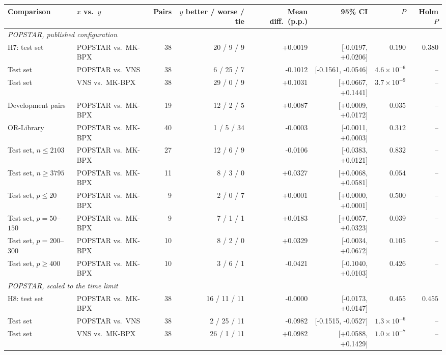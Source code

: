 \begin{tabular}{llrrrrrr}
\toprule
Comparison & $x$ vs.\ $y$ & Pairs & $y$ better / worse / tie & Mean diff.\ (p.p.) & 95\% CI & $P$ & Holm $P$ \\
\midrule
\multicolumn{8}{l}{\emph{POPSTAR, published configuration}} \\
\quad H7: test set & POPSTAR vs.\ MK-BPX & 38 & 20 / 9 / 9 & +0.0019 & [-0.0197, +0.0206] & $0.190$ & $0.380$ \\
\quad Test set & POPSTAR vs.\ VNS & 38 & 6 / 25 / 7 & -0.1012 & [-0.1561, -0.0546] & $4.6\times10^{-6}$ & -- \\
\quad Test set & VNS vs.\ MK-BPX & 38 & 29 / 0 / 9 & +0.1031 & [+0.0667, +0.1441] & $3.7\times10^{-9}$ & -- \\
\quad Development pairs & POPSTAR vs.\ MK-BPX & 19 & 12 / 2 / 5 & +0.0087 & [+0.0009, +0.0172] & $0.035$ & -- \\
\quad OR-Library & POPSTAR vs.\ MK-BPX & 40 & 1 / 5 / 34 & -0.0003 & [-0.0011, +0.0003] & $0.312$ & -- \\
\quad Test set, $n\leq 2103$ & POPSTAR vs.\ MK-BPX & 27 & 12 / 6 / 9 & -0.0106 & [-0.0383, +0.0121] & $0.832$ & -- \\
\quad Test set, $n\geq 3795$ & POPSTAR vs.\ MK-BPX & 11 & 8 / 3 / 0 & +0.0327 & [+0.0068, +0.0581] & $0.054$ & -- \\
\quad Test set, $p\leq 20$ & POPSTAR vs.\ MK-BPX & 9 & 2 / 0 / 7 & +0.0001 & [+0.0000, +0.0001] & $0.500$ & -- \\
\quad Test set, $p=50$--$150$ & POPSTAR vs.\ MK-BPX & 9 & 7 / 1 / 1 & +0.0183 & [+0.0057, +0.0323] & $0.039$ & -- \\
\quad Test set, $p=200$--$300$ & POPSTAR vs.\ MK-BPX & 10 & 8 / 2 / 0 & +0.0329 & [-0.0034, +0.0672] & $0.105$ & -- \\
\quad Test set, $p\geq 400$ & POPSTAR vs.\ MK-BPX & 10 & 3 / 6 / 1 & -0.0421 & [-0.1040, +0.0103] & $0.426$ & -- \\
\midrule
\multicolumn{8}{l}{\emph{POPSTAR, scaled to the time limit}} \\
\quad H8: test set & POPSTAR vs.\ MK-BPX & 38 & 16 / 11 / 11 & -0.0000 & [-0.0173, +0.0147] & $0.455$ & $0.455$ \\
\quad Test set & POPSTAR vs.\ VNS & 38 & 2 / 25 / 11 & -0.0982 & [-0.1515, -0.0527] & $1.3\times10^{-6}$ & -- \\
\quad Test set & VNS vs.\ MK-BPX & 38 & 26 / 1 / 11 & +0.0982 & [+0.0588, +0.1429] & $1.0\times10^{-7}$ & -- \\

\end{tabular}
